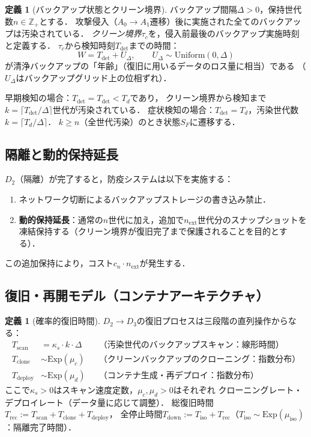 \documentclass[12pt,a4paper]{article}
\theoremstyle{plain}
\theoremstyle{definition}
\newtheorem{definition}[theorem]{定義}
\theoremstyle{remark}
\newcommand{\Z}{\mathbb{Z}}
\newcommand{\Tdet}{T_{\mathrm{det}}}
\newcommand{\Trec}{T_{\mathrm{rec}}}
\newcommand{\Tdown}{T_{\mathrm{down}}}
\begin{document}
\begin{definition}[バックアップ状態とクリーン境界]
バックアップ間隔$\Delta>0$，保持世代数$n\in\Z_+$とする．
攻撃侵入（$A_0\to A_1$遷移）後に実施された全てのバックアップは汚染されている．
\emph{クリーン境界}$\tau_c$を，侵入前最後のバックアップ実施時刻と定義する．
$\tau_c$から検知時刻$\Tdet$までの時間：
\[
  W = \Tdet + U_\Delta,
  \qquad U_\Delta \sim \mathrm{Uniform}(0,\Delta)
\]
が清浄バックアップの「年齢」（復旧に用いるデータのロス量に相当）である
（$U_\Delta$はバックアップグリッド上の位相ずれ）．
\end{definition}

早期検知の場合：$\Tdet=T_{\mathrm{det}}<T_d$であり，
クリーン境界から検知まで$k = \lceil T_{\mathrm{det}}/\Delta\rceil$世代が汚染されている．
症状検知の場合：$\Tdet=T_d$，汚染世代数$k=\lceil T_d/\Delta\rceil$．
$k\ge n$（全世代汚染）のとき状態$S_F$に遷移する．

\subsection{隔離と動的保持延長}

$D_2$（隔離）が完了すると，防疫システムは以下を実施する：
\begin{enumerate}
\item ネットワーク切断によるバックアップストレージの書き込み禁止．
\item \textbf{動的保持延長}：通常の$n$世代に加え，追加で$n_{\mathrm{ext}}$世代分のスナップショットを
  凍結保持する（クリーン境界が復旧完了まで保護されることを目的とする）．
\end{enumerate}

この追加保持により，コスト$c_n\cdot n_{\mathrm{ext}}$が発生する．

\subsection{復旧・再開モデル（コンテナアーキテクチャ）}

\begin{definition}[確率的復旧時間]\label{def:recovery_time}
$D_2\to D_3$の復旧プロセスは三段階の直列操作からなる：
\begin{align*}
  T_{\mathrm{scan}} &= \kappa_s\cdot k\cdot\Delta
    && \text{（汚染世代のバックアップスキャン：線形時間）}\\
  T_{\mathrm{clone}} &\sim \mathrm{Exp}(\mu_c)
    && \text{（クリーンバックアップのクローニング：指数分布）}\\
  T_{\mathrm{deploy}} &\sim \mathrm{Exp}(\mu_d)
    && \text{（コンテナ生成・再デプロイ：指数分布）}
\end{align*}
ここで$\kappa_s>0$はスキャン速度定数，$\mu_c,\mu_d>0$はそれぞれ
クローニングレート・デプロイレート（データ量に応じて調整）．
総復旧時間$\Trec:=T_{\mathrm{scan}}+T_{\mathrm{clone}}+T_{\mathrm{deploy}}$，
全停止時間$\Tdown:=T_{\mathrm{iso}}+\Trec$（$T_{\mathrm{iso}}\sim\mathrm{Exp}(\mu_{\mathrm{iso}})$：隔離完了時間）．
\end{definition}
\end{document}
